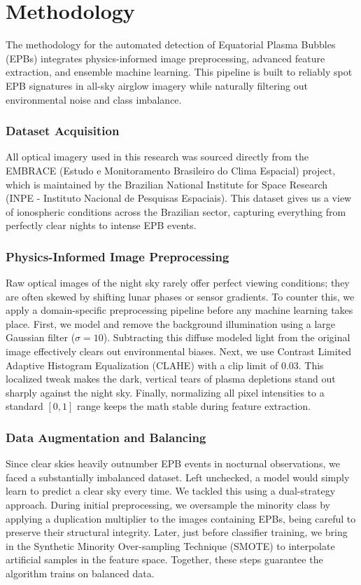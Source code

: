 \chapter{Methodology}\label{chap:methodology}

The methodology for the automated detection of Equatorial Plasma Bubbles (EPBs) integrates physics-informed image preprocessing, advanced feature extraction, and ensemble machine learning. This pipeline is built to reliably spot EPB signatures in all-sky airglow imagery while naturally filtering out environmental noise and class imbalance.

\subsection{Dataset Acquisition}
All optical imagery used in this research was sourced directly from the EMBRACE (Estudo e Monitoramento Brasileiro do Clima Espacial) project, which is maintained by the Brazilian National Institute for Space Research (INPE - Instituto Nacional de Pesquisas Espaciais). This dataset gives us a view of ionospheric conditions across the Brazilian sector, capturing everything from perfectly clear nights to intense EPB events.

\subsection{Physics-Informed Image Preprocessing}
Raw optical images of the night sky rarely offer perfect viewing conditions; they are often skewed by shifting lunar phases or sensor gradients. To counter this, we apply a domain-specific preprocessing pipeline before any machine learning takes place. First, we model and remove the background illumination using a large Gaussian filter ($\sigma=10$). Subtracting this diffuse modeled light from the original image effectively clears out environmental biases. Next, we use Contrast Limited Adaptive Histogram Equalization (CLAHE) with a clip limit of 0.03. This localized tweak makes the dark, vertical tears of plasma depletions stand out sharply against the night sky. Finally, normalizing all pixel intensities to a standard $[0, 1]$ range keeps the math stable during feature extraction.

\subsection{Data Augmentation and Balancing}
Since clear skies heavily outnumber EPB events in nocturnal observations, we faced a substantially imbalanced dataset. Left unchecked, a model would simply learn to predict a clear sky every time. We tackled this using a dual-strategy approach. During initial preprocessing, we oversample the minority class by applying a duplication multiplier to the images containing EPBs, being careful to preserve their structural integrity. Later, just before classifier training, we bring in the Synthetic Minority Over-sampling Technique (SMOTE) to interpolate artificial samples in the feature space. Together, these steps guarantee the algorithm trains on balanced data.

